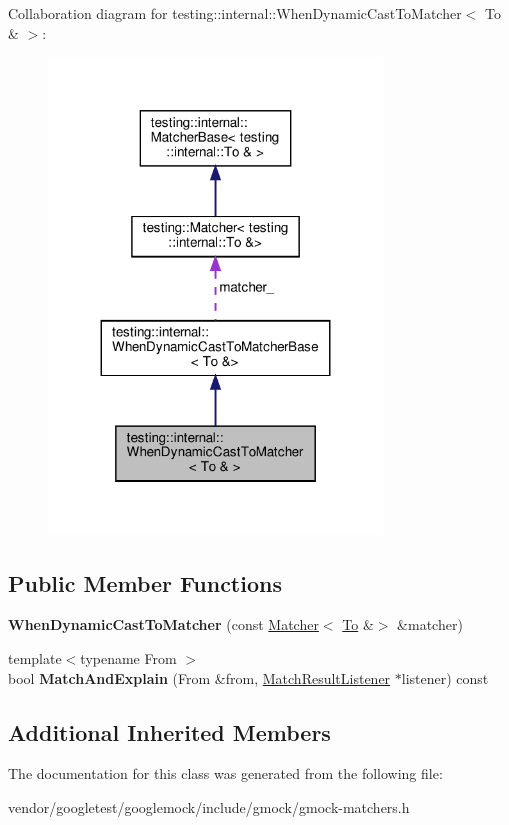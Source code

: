 Collaboration diagram for testing\+:\+:internal\+:\+:When\+Dynamic\+Cast\+To\+Matcher$<$ To \& $>$\+:
\nopagebreak
\begin{figure}[H]
\begin{center}
\leavevmode
\includegraphics[width=251pt]{classtesting_1_1internal_1_1_when_dynamic_cast_to_matcher_3_01_to_01_6_01_4__coll__graph}
\end{center}
\end{figure}
\subsection*{Public Member Functions}
\begin{DoxyCompactItemize}
\item 
\mbox{\label{classtesting_1_1internal_1_1_when_dynamic_cast_to_matcher_3_01_to_01_6_01_4_a1ba7bc63566075d2afe18905e5c7ad76}} 
{\bfseries When\+Dynamic\+Cast\+To\+Matcher} (const \hyperlink{classtesting_1_1_matcher}{Matcher}$<$ \hyperlink{classtesting_1_1internal_1_1_to}{To} \&$>$ \&matcher)
\item 
\mbox{\label{classtesting_1_1internal_1_1_when_dynamic_cast_to_matcher_3_01_to_01_6_01_4_a1eb76a60d0943519623f438b29f70a5f}} 
{\footnotesize template$<$typename From $>$ }\\bool {\bfseries Match\+And\+Explain} (From \&from, \hyperlink{classtesting_1_1_match_result_listener}{Match\+Result\+Listener} $\ast$listener) const
\end{DoxyCompactItemize}
\subsection*{Additional Inherited Members}


The documentation for this class was generated from the following file\+:\begin{DoxyCompactItemize}
\item 
vendor/googletest/googlemock/include/gmock/gmock-\/matchers.\+h\end{DoxyCompactItemize}

